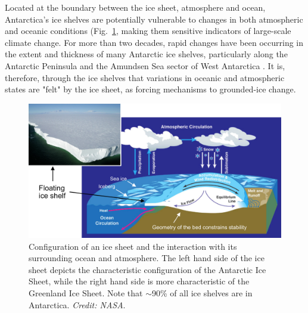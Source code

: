 Located at the boundary between the ice sheet, atmosphere and ocean,
Antarctica's ice shelves are potentially vulnerable to changes in both
atmospheric and oceanic conditions (Fig.~\ref{fig:ice-sheet-configuration}, making them sensitive indicators of
large-scale climate change. For more than two decades, rapid
changes have been occurring in the extent and thickness of many Antarctic ice
shelves, particularly along the Antarctic Peninsula and the Amundsen Sea
sector of West Antarctica \parencite{Cook2010, Pritchard2012, Shepherd2010,
Wingham2009, Zwally2005, Fricker2012}. It is,
therefore, through the ice shelves that variations in
oceanic and atmospheric states are "felt" by the ice sheet, as forcing mechanisms
to grounded-ice change.


\begin{figure}[!ht]
  \includegraphics[width=\textwidth]{img/ice_sheet_configuration2.png} %
  \caption[Configuration of the Antarctic Ice Sheet]{
  Configuration of an ice sheet and the interaction with its surrounding ocean and atmosphere. The left hand side of the ice sheet depicts the characteristic configuration of the Antarctic Ice Sheet, while the right hand side is more characteristic of the Greenland Ice Sheet. Note that $\sim$90\% of all ice shelves are in Antarctica. {\it Credit: NASA}.
  }
  \label{fig:ice-sheet-configuration}
\end{figure}



